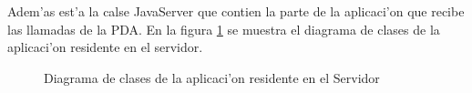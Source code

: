 Adem'as est'a la calse JavaServer que contien la parte de la aplicaci'on que recibe las llamadas de la PDA.
En la figura \ref{fig:dclasesServidor} se muestra el diagrama de clases de la aplicaci'on residente en el servidor.
\begin{figure}[h!]
	\begin{center}
        		\framebox{\includegraphics[scale=0.1{dclasesServidor.png}} 
     	\end{center}
    	\caption{Diagrama de clases de la aplicaci'on residente en el Servidor}
	\label{fig:dclasesServidor}
\end{figure}
